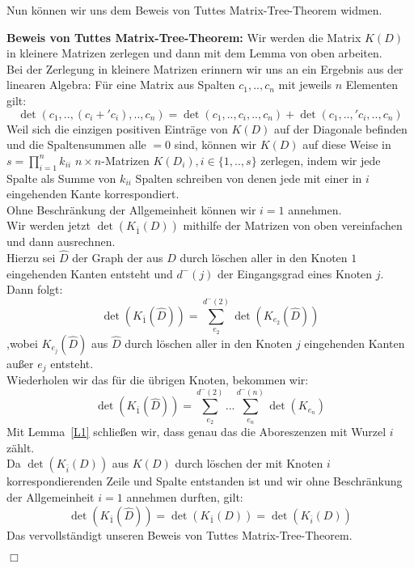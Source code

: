Nun können wir uns dem Beweis von Tuttes Matrix-Tree-Theorem widmen.

\textbf{Beweis von Tuttes Matrix-Tree-Theorem:}
Wir werden die Matrix $K(D)$ in kleinere Matrizen zerlegen und dann mit dem Lemma von oben arbeiten.\\
Bei der Zerlegung in kleinere Matrizen erinnern wir uns an ein Ergebnis aus der linearen Algebra:
Für eine Matrix aus Spalten $c_1,..,c_n$ mit jeweils $n$ Elementen gilt:
\begin{equation}
 \det(c_1,..,(c_i+\prime{c_i}),..,c_n) = \det(c_1,..,c_i,..,c_n) + \det(c_1,..,\prime{c_i},..,c_n)
\end{equation}
Weil sich die einzigen positiven Einträge von $K(D)$ auf der Diagonale befinden und die Spaltensummen alle $=0$ sind, können wir $K(D)$ auf diese Weise in  $s=\prod_{i=1}^nk_{ii}$ $n \times n$-Matrizen $K(D_i), i\in\{1,..,s\}$ zerlegen, indem wir jede Spalte als Summe von $k_{ii}$ Spalten schreiben von denen jede mit einer in $i$ eingehenden Kante korrespondiert.\\
Ohne Beschränkung der Allgemeinheit können wir $i=1$ annehmen.\\
Wir werden jetzt $\det(K_{\bar{1}}(D))$ mithilfe der Matrizen von oben vereinfachen und dann ausrechnen.\\
Hierzu sei $\hat{D}$ der Graph der aus $D$ durch löschen aller in den Knoten $1$ eingehenden Kanten entsteht und $d^{-}(j)$ der Eingangsgrad eines Knoten $j$. Dann folgt:
\begin{equation}
 \det(K_{\bar{1}}(\hat{D})) = \sum_{e_2}^{d^{-}(2)}\det(K_{e_2}(\hat{D}))
\end{equation}
,wobei $K_{e_j}(\hat{D})$ aus $\hat{D}$ durch löschen aller in den Knoten $j$ eingehenden Kanten außer $e_j$ entsteht.\\
Wiederholen wir das für die übrigen Knoten, bekommen wir:
\begin{equation}
  \det(K_{\bar{1}}(\hat{D})) = \sum_{e_2}^{d^{-}(2)}...\sum_{e_n}^{d^{-}(n)}\det(K_{e_n})
\end{equation}
Mit Lemma~\ref{L1} schließen wir, dass genau das die Aboreszenzen mit Wurzel $i$ zählt.\\
Da $\det(K_{\bar{i}}(D))$ aus $K(D)$ durch löschen der mit Knoten $i$ korrespondierenden Zeile und Spalte entstanden ist und wir ohne Beschränkung der Allgemeinheit $i=1$ annehmen durften, gilt:
\begin{equation}
 \det(K_{\bar{1}}(\hat{D}))=\det(K_{\bar{1}}(D))=\det(K_{\bar{i}}(D))
\end{equation}
Das vervollständigt unseren Beweis von Tuttes Matrix-Tree-Theorem.
\begin{flushright} $\Box$ \end{flushright} 

